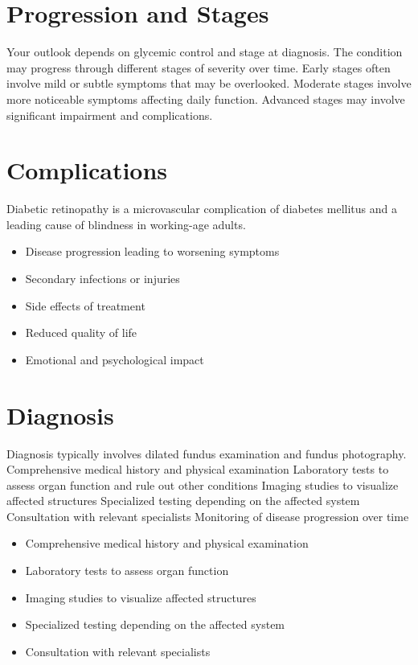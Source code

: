 \section{Progression and Stages}
Your outlook depends on glycemic control and stage at diagnosis. The condition may progress through different stages of severity over time. Early stages often involve mild or subtle symptoms that may be overlooked. Moderate stages involve more noticeable symptoms affecting daily function. Advanced stages may involve significant impairment and complications.
\section{Complications}
Diabetic retinopathy is a microvascular complication of diabetes mellitus and a leading cause of blindness in working-age adults.

\begin{itemize}[noitemsep]
  \item Disease progression leading to worsening symptoms
  \item Secondary infections or injuries
  \item Side effects of treatment
  \item Reduced quality of life
  \item Emotional and psychological impact
\end{itemize}
\section{Diagnosis}
Diagnosis typically involves dilated fundus examination and fundus photography. Comprehensive medical history and physical examination Laboratory tests to assess organ function and rule out other conditions Imaging studies to visualize affected structures Specialized testing depending on the affected system Consultation with relevant specialists Monitoring of disease progression over time

\begin{itemize}[noitemsep]
  \item Comprehensive medical history and physical examination
  \item Laboratory tests to assess organ function
  \item Imaging studies to visualize affected structures
  \item Specialized testing depending on the affected system
  \item Consultation with relevant specialists
\end{itemize}
